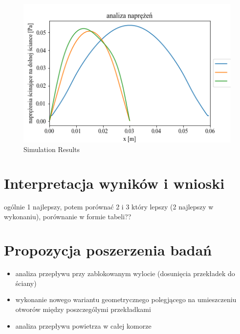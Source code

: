 \documentclass[peerreview]{IEEEtran}
\begin{document}
\begin{figure}[!h]
\centering
\includegraphics[width=0.8\columnwidth]{wall_shear} 
\caption{Simulation Results}
\label{fig_sim}
\end{figure} 

\section{Interpretacja wyników i wnioski}

ogólnie 1 najlepszy, potem porównać 2 i 3 który lepszy (2 najlepszy w wykonaniu), porównanie w formie tabeli??

\section{Propozycja poszerzenia badań}

\begin{itemize}
\item analiza przepływu przy zablokowanym wylocie (dosunięcia przekładek do ściany)
\item wykonanie nowego wariantu geometrycznego polegjącego na umieszczeniu otworów między poszczególymi przekładkami
\item analiza przepływu powietrza w całej komorze
\end{itemize} 


\end{document}
